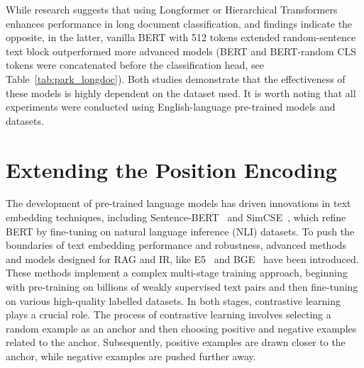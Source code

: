 While \textcite{dai2022revisitingtransformer} research suggests that using Longformer or Hierarchical Transformers enhances performance in long document classification, \textcite{park2022efficient} and \textcite{jaiswal2023breakingtokenbarrierchunking} findings indicate the opposite, in the latter, vanilla BERT with 512 tokens extended random-sentence text block outperformed more advanced models (BERT and BERT-random CLS tokens were concatenated before the classification head, see Table~\ref{tab:park_longdoc}). 
Both studies demonstrate that the effectiveness of these models is highly dependent on the dataset used.
It is worth noting that all experiments were conducted using English-language pre-trained models and datasets.

\section{Extending the Position Encoding}
The development of pre-trained language models has driven innovations in text embedding techniques, including Sentence-BERT~\parencite{reimers-2019-sentence-bert} and SimCSE~\parencite{gao2022simcse}, which refine BERT by fine-tuning on natural language inference (NLI) datasets. 
To push the boundaries of text embedding performance and robustness, advanced methods and models designed for RAG and IR, like E5~\parencite{wang2024textembeddingsweaklysupervisedcontrastive} and BGE~\parencite{xiao2024cpackpackagedresourcesadvance} have been introduced. 
These methods implement a complex multi-stage training approach, beginning with pre-training on billions of weakly supervised text pairs and then fine-tuning on various high-quality labelled datasets. In both stages, contrastive learning plays a crucial role.
The process of contrastive learning involves selecting a random example as an anchor and then choosing positive and negative examples related to the anchor. 
Subsequently, positive examples are drawn closer to the anchor, while negative examples are pushed further away.

